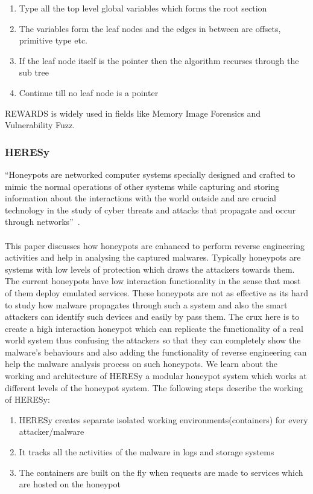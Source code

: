 \documentclass[11pt]{article}
\begin{document}
		\begin{enumerate}
			\item Type all the top level global variables which forms the root section
			\item The variables form the leaf nodes and the edges in between are offsets, primitive type etc.
			\item If the leaf node itself is the pointer then the algorithm recurses through the sub tree
			\item Continue till no leaf node is a pointer
		\end{enumerate}
		REWARDS is widely used in fields like Memory Image Forensics and Vulnerability Fuzz.
		
		\subsubsection{HERESy}
		“Honeypots are networked computer systems specially designed and crafted to mimic the normal operations of other systems while capturing and storing information about the interactions with the world outside and are crucial technology in the study of cyber threats and attacks that propagate and occur through networks”~\cite{honeypot2016}.\\ \\
		This paper discusses how  honeypots are enhanced to perform reverse engineering activities and help in analysing the captured malwares. Typically honeypots are systems with low levels of protection which draws the attackers towards them. The current honeypots have low interaction functionality in the sense that most of them deploy emulated services. These honeypots are not as effective as its hard to study how malware propagates through such a system and also the smart attackers can identify such devices and easily by pass them. The crux here is to create a high interaction honeypot which can replicate the functionality of a real world system thus confusing the attackers so that they can completely show the malware’s behaviours and also adding the functionality of reverse engineering can help the malware analysis process on such honeypots. We learn about the working and architecture of HERESy a modular honeypot system which works at different levels of the honeypot system. The following steps describe the working of HERESy:
		\begin{enumerate}
			\item HERESy creates separate isolated working environments(containers) for every attacker/malware
			\item It tracks all the activities of the malware in logs and storage systems
			\item The containers are built on the fly when requests are made to services which are hosted on the honeypot
		\end{enumerate}
\end{document}
